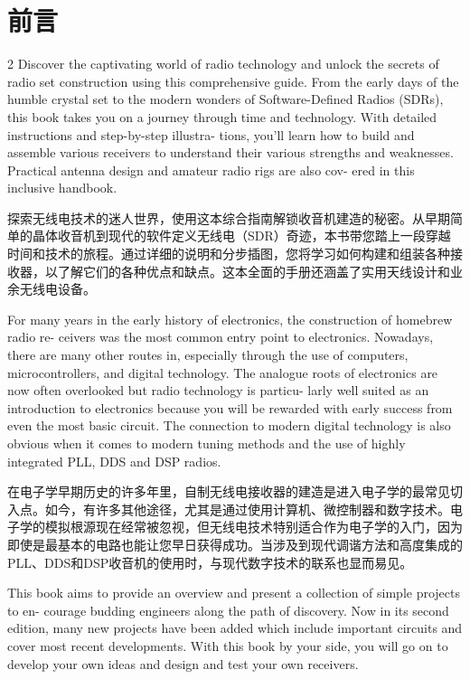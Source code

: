 \documentclass{ctexbook}
\begin{document}
\chapter*{前言}
\begin{paracol}{2}
\setlength{\columnsep}{2em}
Discover the captivating world of radio technology and unlock the secrets of radio set 
construction using this comprehensive guide. From the early days of the humble crystal 
set to the modern wonders of Software-Defined Radios (SDRs), this book takes you on a 
journey through time and technology. With detailed instructions and step-by-step illustra-
tions, you'll learn how to build and assemble various receivers to understand their various 
strengths and weaknesses. Practical antenna design and amateur radio rigs are also cov-
ered in this inclusive handbook. 

\switchcolumn

探索无线电技术的迷人世界，使用这本综合指南解锁收音机建造的秘密。从早期简单的晶体收音机到现代的软件定义无线电（SDR）奇迹，本书带您踏上一段穿越时间和技术的旅程。通过详细的说明和分步插图，您将学习如何构建和组装各种接收器，以了解它们的各种优点和缺点。这本全面的手册还涵盖了实用天线设计和业余无线电设备。

\switchcolumn*

For many years in the early history of electronics, the construction of homebrew radio re-
ceivers was the most common entry point to electronics. Nowadays, there are many other 
routes in, especially through the use of computers, microcontrollers, and digital technology. 
The analogue roots of electronics are now often overlooked but radio technology is particu-
larly well suited as an introduction to electronics because you will be rewarded with early 
success from even the most basic circuit. The connection to modern digital technology is 
also obvious when it comes to modern tuning methods and the use of highly integrated 
PLL, DDS and DSP radios. 

\switchcolumn

在电子学早期历史的许多年里，自制无线电接收器的建造是进入电子学的最常见切入点。如今，有许多其他途径，尤其是通过使用计算机、微控制器和数字技术。电子学的模拟根源现在经常被忽视，但无线电技术特别适合作为电子学的入门，因为即使是最基本的电路也能让您早日获得成功。当涉及到现代调谐方法和高度集成的PLL、DDS和DSP收音机的使用时，与现代数字技术的联系也显而易见。

\switchcolumn*

This book aims to provide an overview and present a collection of simple projects to en-
courage budding engineers along the path of discovery. Now in its second edition, many 
new projects have been added which include important circuits and cover most recent 
developments. With this book by your side, you will go on to develop your own ideas and 
design and test your own receivers. 


\end{paracol}
\end{document}
